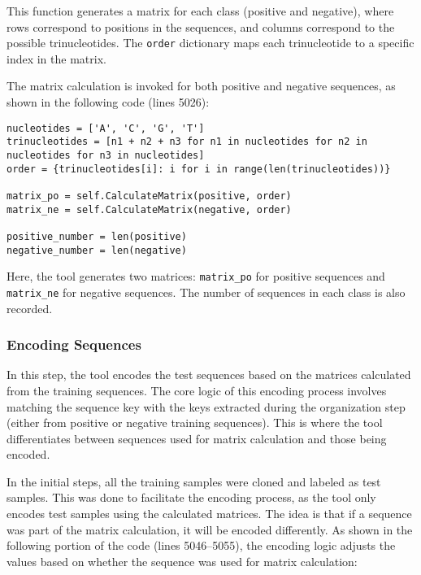       This function generates a matrix for each class (positive and negative), where rows correspond to positions in the sequences, and columns correspond to the possible trinucleotides. The \texttt{order} dictionary maps each trinucleotide to a specific index in the matrix.

      The matrix calculation is invoked for both positive and negative sequences, as shown in the following code (lines 5026):

      \begin{lstlisting}[caption={Invoking Matrix Calculation}, label={lst:matrices-calculation-2}]
nucleotides = ['A', 'C', 'G', 'T']
trinucleotides = [n1 + n2 + n3 for n1 in nucleotides for n2 in nucleotides for n3 in nucleotides]
order = {trinucleotides[i]: i for i in range(len(trinucleotides))}

matrix_po = self.CalculateMatrix(positive, order)
matrix_ne = self.CalculateMatrix(negative, order)

positive_number = len(positive)
negative_number = len(negative)
      \end{lstlisting}

      Here, the tool generates two matrices: \texttt{matrix\_po} for positive sequences and \texttt{matrix\_ne} for negative sequences.
      The number of sequences in each class is also recorded.

    \subsubsection*{Encoding Sequences}

      In this step, the tool encodes the test sequences based on the matrices calculated from the training sequences.
      The core logic of this encoding process involves matching the sequence key with the keys extracted during the organization step (either from positive or negative training sequences).
      This is where the tool differentiates between sequences used for matrix calculation and those being encoded.

      In the initial steps, all the training samples were cloned and labeled as test samples.
      This was done to facilitate the encoding process, as the tool only encodes test samples using the calculated matrices.
      The idea is that if a sequence was part of the matrix calculation, it will be encoded differently.
      As shown in the following portion of the code (lines 5046–5055), the encoding logic adjusts the values based on whether the sequence was used for matrix calculation:

